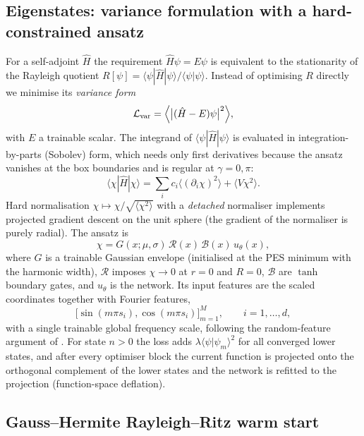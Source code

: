 \documentclass[11pt,a4paper]{article}
\begin{document}
\subsection{Eigenstates: variance formulation with a hard-constrained ansatz}

For a self-adjoint $\hat H$ the requirement $\hat H\psi=E\psi$ is equivalent to
the stationarity of the Rayleigh quotient
$R[\psi]=\langle\psi|\hat H|\psi\rangle/\langle\psi|\psi\rangle$. Instead of
optimising $R$ directly we minimise its \emph{variance form}
\begin{equation}
 \mathcal L_{\rm var}
   =\Bigl\langle\bigl|(\hat H-E)\psi\bigr|^2\Bigr\rangle ,
 \label{eq:var}
\end{equation}
with $E$ a trainable scalar. The integrand of $\langle\psi|\hat H|\psi\rangle$ is
evaluated in integration-by-parts (Sobolev) form, which needs only first
derivatives because the ansatz vanishes at the box boundaries and is regular at
$\gamma=0,\pi$:
\begin{equation}
 \langle\chi|\hat H|\chi\rangle =
 \sum_i c_i\bigl\langle(\partial_i\chi)^2\bigr\rangle+\langle V\chi^2\rangle .
\end{equation}
Hard normalisation $\chi\mapsto\chi/\sqrt{\langle\chi^2\rangle}$ with a
\emph{detached} normaliser implements projected gradient descent on the unit
sphere (the gradient of the normaliser is purely radial). The ansatz is
\begin{equation}
 \chi=G(x;\mu,\sigma)\,\mathcal R(x)\,\mathcal B(x)\,u_\theta(x),
\end{equation}
where $G$ is a trainable Gaussian envelope (initialised at the PES minimum with
the harmonic width), $\mathcal R$ imposes $\chi\to0$ at $r=0$ and $R=0$,
$\mathcal B$ are $\tanh$ boundary gates, and $u_\theta$ is the network. Its
input features are the scaled coordinates together with Fourier features,
\begin{equation}
 \bigl[\sin(m\pi s_i),\cos(m\pi s_i)\bigr]_{m=1}^{M},\qquad i=1,\dots,d,
 \label{eq:fft}
\end{equation}
with a single trainable global frequency scale, following the random-feature
argument of \cite{tancik2021}. For state $n>0$ the loss adds
$\lambda\langle\psi|\psi_m\rangle^2$ for all converged lower states, and after
every optimiser block the current function is projected onto the orthogonal
complement of the lower states and the network is refitted to the projection
(function-space deflation).

\subsection{Gauss--Hermite Rayleigh--Ritz warm start}
\end{document}
